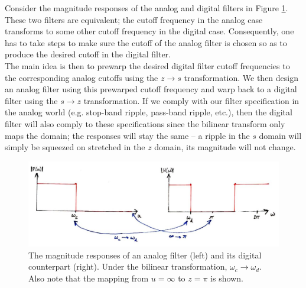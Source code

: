 %
Consider the magnitude responses of the analog and digital filters in
Figure \ref{fig::lecture_18_prewarp}. These two filters are equivalent;
the cutoff frequency in the analog case transforms to some other
cutoff frequency in the digital case. Consequently, one has to take
steps to make sure the cutoff of the analog filter is chosen so as
to produce the desired cutoff in the digital filter.\\
%
The main idea is then to prewarp the desired digital filter cutoff
frequencies to the corresponding analog cutoffs using the $z\rightarrow s$
transformation. We then design an analog filter using this prewarped
cutoff frequency and warp back to a digital filter using the $s\rightarrow z$
transformation. If we comply with our filter specification in the
analog world (e.g. stop-band ripple, pass-band ripple, etc.), then
the digital filter will also comply to these specifications since
the bilinear transform only maps the domain; the responses will
stay the same -- a ripple in the $s$ domain will simply be squeezed
on stretched in the $z$ domain, its magnitude will not change.
%
\begin{figure}[H]
  \includegraphics[width=\textwidth]{images/lecture_18_prewarp.JPG}
  \caption{The magnitude responses of an analog filter (left) and its
    digital counterpart (right). Under the
    bilinear transformation, $\omega_c\rightarrow\omega_d$. Also note
    that the mapping from $u=\infty$ to $z=\pi$ is shown.
  }
  \label{fig::lecture_18_prewarp}
\end{figure}
%
